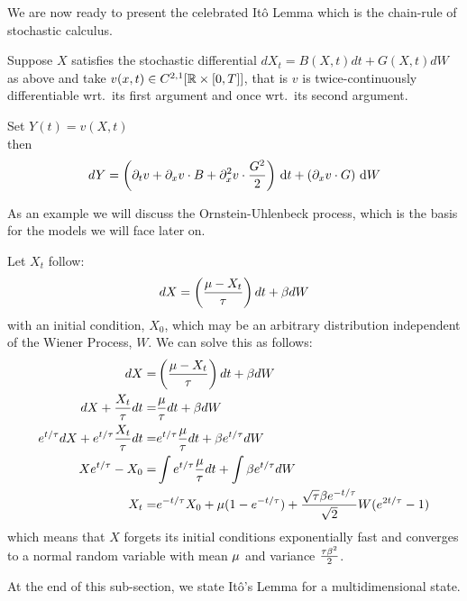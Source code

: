 We are now ready to present the celebrated It\^o Lemma which is the chain-rule of
stochastic calculus.

\begin{thm}[It\^o Lemma]
Suppose $X$ satisfies the stochastic differential $dX_t =
B(X,t)dt + G(X,t) dW$ as above and take $v(x,t) \in C^{2,1}[ { \mathbb{R} } \times [0,T]]$,
that is $v$ is twice-continuously differentiable wrt.\ its first argument and
once wrt.\ its second argument.

Set $Y(t) = v(X,t)$
\\
then
$$
dY =  \left( {\partial}_t v + {\partial}_x v \cdot B + {\partial}^2_x v \cdot
\frac{G^2}2 \right)
\, \mathrm{d} t + \left(   {\partial}_x v\cdot G  \right)\, \mathrm{d} W
$$ 
\end{thm} 
 

As an example we will discuss the Ornstein-Uhlenbeck process, which is the
basis for the models we will face later on.
\begin{ex}[O-U Process] Let $X_t$ follow:
\begin{equation}
dX = \left( \frac {{\mu } -X_t}{{ \tau }} \right) dt + \beta dW
\label{eq:OU_equation_generic}
\end{equation}
with an initial condition, $X_0$, which may be an arbitrary distribution
independent of the Wiener Process, $W$.
We can solve this as follows: 
\begin{align*}
dX =& \left( \frac {{\mu } -X_t}{{ \tau }} \right)  dt + \beta dW
\\
dX + \frac {X_t}{{ \tau }} dt=&  \frac{{\mu }}{{ \tau }} dt + \beta dW
\\
e^{t/{ \tau }} dX + e^{t/{ \tau }}\frac {X_t}{{ \tau }} dt
=& e^{t/{ \tau }}\frac{{\mu }}{{ \tau }} dt + \beta e^{t/{ \tau }} dW
\\
Xe^{t/{ \tau }} - X_0 
=& \int  e^{t/{ \tau }}\frac{{\mu }}{{ \tau }} dt +  \int \beta e^{t/{ \tau }} dW
\\
X_t =& e^{-t/{ \tau }} X_0 + {\mu }(1-e^{-t/{ \tau }}) +  \frac{\sqrt{{ \tau }}\beta
e^{-t/{ \tau }}}{\sqrt{2}} W(e^{2t/{ \tau }}-1)
\end{align*}
which means that $X$ forgets its initial conditions exponentially fast and
converges to a normal random variable with mean ${\mu }$ and variance
$\tfrac{{ \tau } \beta^2}{2}$.
\end{ex}

At the end of this sub-section, we state It\^o's Lemma for a multidimensional
state.
 


